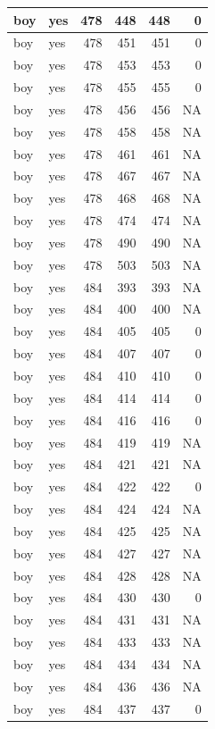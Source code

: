 \documentclass[man]{apa6}
\begin{document}
\begin{tabular}{l|l|r|r|r|r}
\hline
boy & yes & 478 & 448 & 448 & 0\\
\hline
boy & yes & 478 & 451 & 451 & 0\\
\hline
boy & yes & 478 & 453 & 453 & 0\\
\hline
boy & yes & 478 & 455 & 455 & 0\\
\hline
boy & yes & 478 & 456 & 456 & NA\\
\hline
boy & yes & 478 & 458 & 458 & NA\\
\hline
boy & yes & 478 & 461 & 461 & NA\\
\hline
boy & yes & 478 & 467 & 467 & NA\\
\hline
boy & yes & 478 & 468 & 468 & NA\\
\hline
boy & yes & 478 & 474 & 474 & NA\\
\hline
boy & yes & 478 & 490 & 490 & NA\\
\hline
boy & yes & 478 & 503 & 503 & NA\\
\hline
boy & yes & 484 & 393 & 393 & NA\\
\hline
boy & yes & 484 & 400 & 400 & NA\\
\hline
boy & yes & 484 & 405 & 405 & 0\\
\hline
boy & yes & 484 & 407 & 407 & 0\\
\hline
boy & yes & 484 & 410 & 410 & 0\\
\hline
boy & yes & 484 & 414 & 414 & 0\\
\hline
boy & yes & 484 & 416 & 416 & 0\\
\hline
boy & yes & 484 & 419 & 419 & NA\\
\hline
boy & yes & 484 & 421 & 421 & NA\\
\hline
boy & yes & 484 & 422 & 422 & 0\\
\hline
boy & yes & 484 & 424 & 424 & NA\\
\hline
boy & yes & 484 & 425 & 425 & NA\\
\hline
boy & yes & 484 & 427 & 427 & NA\\
\hline
boy & yes & 484 & 428 & 428 & NA\\
\hline
boy & yes & 484 & 430 & 430 & 0\\
\hline
boy & yes & 484 & 431 & 431 & NA\\
\hline
boy & yes & 484 & 433 & 433 & NA\\
\hline
boy & yes & 484 & 434 & 434 & NA\\
\hline
boy & yes & 484 & 436 & 436 & NA\\
\hline
boy & yes & 484 & 437 & 437 & 0\\

\end{tabular}
\end{document}
